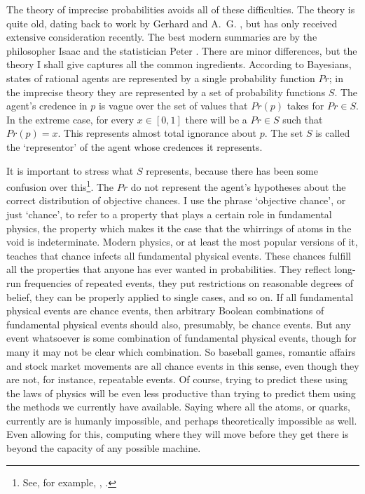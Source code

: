 The theory of imprecise probabilities avoids all of these difficulties. The theory is quite old, dating back to work by Gerhard \citet{Tintner1941} and A.~G. \citet{Hart1942}, but has only received extensive consideration recently. The best modern summaries are by the philosopher Isaac \citet{Levi1980} and the statistician Peter \citet{Walley1991}. There are minor differences, but the theory I shall give captures all the common ingredients. According to Bayesians, states of rational agents are represented by a single probability function \(Pr\); in the imprecise theory they are represented by a set of probability functions \(S\). The agent's credence in \(p\) is vague over the set of values that \(Pr(p)\) takes for \(Pr \in S\). In the extreme case, for every \(x \in [0, 1]\) there will be a \(Pr \in S\) such that \(Pr(p) = x\). This represents almost total ignorance about \(p\). The set \(S\) is called the `representor' of the agent whose credences it represents.

It is important to stress what \(S\) represents, because there has been some confusion over this\footnote{See, for example, \citet{GardenforsSahlin1982}, \citet{Levi1982}.}. The \(Pr\) do not represent the agent's hypotheses about the correct distribution of objective chances. I use the phrase `objective chance', or just `chance', to refer to a property that plays a certain role in fundamental physics, the property which makes it the case that the whirrings of atoms in the void is indeterminate. Modern physics, or at least the most popular versions of it, teaches that chance infects all fundamental physical events. These chances fulfill all the properties that anyone has ever wanted in probabilities. They reflect long-run frequencies of repeated events, they put restrictions on reasonable degrees of belief, they can be properly applied to single cases, and so on. If all fundamental physical events are chance events, then arbitrary Boolean combinations of fundamental physical events should also, presumably, be chance events. But any event whatsoever is some combination of fundamental physical events, though for many it may not be clear which combination. So baseball games, romantic affairs and stock market movements are all chance events in this sense, even though they are not, for instance, repeatable events. Of course, trying to predict these using the laws of physics will be even less productive than trying to predict them using the methods we currently have available. Saying where all the atoms, or quarks, currently are is humanly impossible, and perhaps theoretically impossible as well. Even allowing for this, computing where they will move before they get there is beyond the capacity of any possible machine. 

